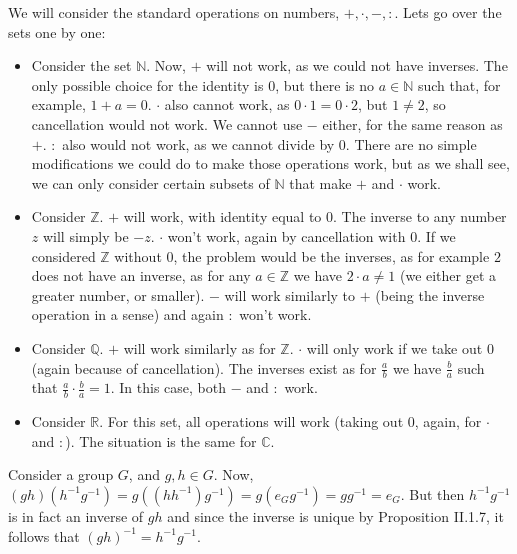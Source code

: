 \begin{solution}
	We will consider the standard operations on numbers, $+,\cdot,-, :$. Lets go over the sets one by one:
	\begin{itemize}
		\item Consider the set $\mathbb{N}$. Now, $+$ will not work, as we could not have inverses. The only possible choice for the identity is $0$, but there is no $a \in \mathbb{N}$ such that, for example, $1+a=0$. $\cdot$ also cannot work, as $0 \cdot 1 = 0 \cdot 2$, but $1 \neq 2$, so cancellation would not work. We cannot use $-$ either, for the same reason as $+$. $:$ also would not work, as we cannot divide by $0$. There are no simple modifications we could do to make those operations work, but as we shall see, we can only consider certain subsets of $\mathbb{N}$ that make $+$ and $\cdot$ work.
		\item Consider $\mathbb{Z}$. $+$ will work, with identity equal to 0. The inverse to any number $z$ will simply be $-z$. $\cdot$ won't work, again by cancellation with $0$. If we considered $\mathbb{Z}$ without $0$, the problem would be the inverses, as for example $2$ does not have an inverse, as for any $a \in \mathbb{Z}$ we have $2 \cdot a \neq 1$ (we either get a greater number, or smaller). $-$ will work similarly to $+$ (being the inverse operation in a sense) and again $:$ won't work.
		\item Consider $\mathbb{Q}$. $+$ will work similarly as for $\mathbb{Z}$. $\cdot$ will only work if we take out $0$ (again because of cancellation). The inverses exist as for $\frac{a}{b}$ we have $\frac{b}{a}$ such that $\frac{a}{b}\cdot\frac{b}{a}=1$. In this case, both $-$ and $:$ work.
		\item Consider $\mathbb{R}$. For this set, all operations will work (taking out $0$, again, for $\cdot$ and $:$). The situation is the same for $\mathbb{C}$. \qedhere
	\end{itemize}
\end{solution}

\begin{problem}
\end{problem}

\begin{solution}
	Consider a group $G$, and $g, h \in G$. Now, $(gh)(h^{-1}g^{-1})=g((hh^{-1})g^{-1})=g(e_Gg^{-1})=gg^{-1}=e_G$. But then $h^{-1}g^{-1}$ is in fact an inverse of $gh$ and since the inverse is unique by Proposition II.1.7, it follows that $(gh)^{-1} = h^{-1}g^{-1}$.
\end{solution}

